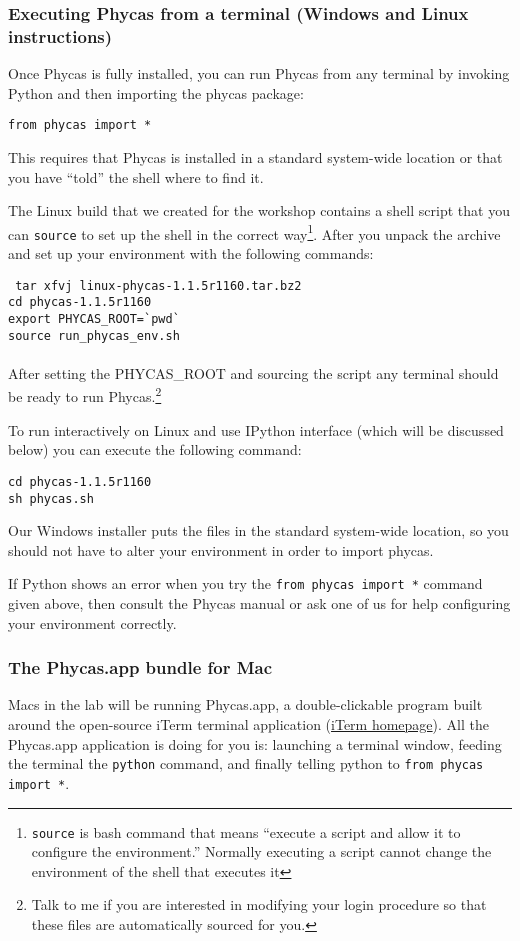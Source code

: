 \documentclass{article}
\newcommand{\cmd}[1]{\texttt{#1}\xspace}
\newcommand{\phycas}{Phycas\xspace}
\begin{document}
\subsubsection{Executing Phycas from a terminal (Windows and Linux instructions)}
Once Phycas is fully installed, you can run \phycas from any terminal by invoking Python and then importing the phycas package:
\begin{verbatim}
from phycas import *
\end{verbatim}
This requires that \phycas is installed in a standard system-wide location or that you have ``told'' the shell where to find it.


The Linux build that we created for the workshop contains a shell script that you can \cmd{source} to set up the shell in the correct way\footnote{\cmd{source} is bash command that means ``execute a script and allow it to configure the environment.'' Normally executing a script cannot change the environment of the shell that executes it}.
After you unpack the archive and set up your environment with the following commands:\par
{\tt
tar xfvj linux-phycas-1.1.5r1160.tar.bz2\\
cd phycas-1.1.5r1160\\
export PHYCAS\_ROOT=\`{}pwd\`{}\\
source run\_phycas\_env.sh\\
}\\
After setting the PHYCAS\_ROOT and sourcing the script any terminal should be ready to run Phycas.\footnote{Talk to me if you are interested in modifying your login procedure so that these files are automatically sourced for you.}

To run interactively on Linux and use IPython interface (which will be discussed below) you can execute the following command:
\begin{verbatim}
cd phycas-1.1.5r1160
sh phycas.sh
\end{verbatim}

Our Windows installer puts the files in the standard system-wide location, so you should not have to alter your environment in order to import phycas.

If Python shows an error when you try the \cmd{from phycas import *}  command given above, then consult the \phycas manual or ask one
of us for help configuring your environment correctly.




\subsubsection{The Phycas.app bundle for Mac}
Macs in the lab will be running Phycas.app, a double-clickable program built around the open-source iTerm terminal application (\href{http://iterm.sourceforge.net/}{iTerm homepage}).
All the Phycas.app application is doing for you is: launching a terminal window, feeding the terminal the \cmd{python} command, and finally telling python to \cmd{from phycas import *}.
\end{document}
